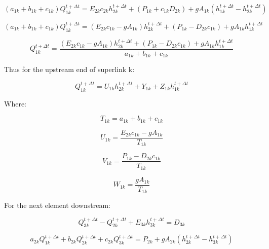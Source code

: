 \documentclass[11pt]{article}
\begin{document}
\begin{equation}
  (a_{1k} + b_{1k} + c_{1k}) Q_{1k}^{t + \Delta t} = E_{2k} c_{2k} h_{2k}^{t + \Delta t} + (P_{1k} + c_{1k} D_{2k}) + g A_{1k} (h_{1k}^{t + \Delta t} - h_{2k}^{t + \Delta t})
\end{equation}

\begin{equation}
  (a_{1k} + b_{1k} + c_{1k}) Q_{1k}^{t + \Delta t} = ( E_{2k} c_{1k} - g A_{1k} ) h_{2k}^{t + \Delta t} + (P_{1k} -  D_{2k} c_{1k}) + g A_{1k} h_{1k}^{t + \Delta t}
\end{equation}


\begin{equation}
   Q_{1k}^{t + \Delta t} = \frac{( E_{2k} c_{1k} - g A_{1k} ) h_{2k}^{t + \Delta t} + (P_{1k} -  D_{2k} c_{1k}) + g A_{1k} h_{1k}^{t + \Delta t}}{a_{1k} + b_{1k} + c_{1k}}
\end{equation}

Thus for the upstream end of superlink k:

\begin{equation}
  \boxed{
  Q_{1k}^{t + \Delta t} = U_{1k} h_{2k}^{t + \Delta t} + Y_{1k} + Z_{1k} h_{1k}^{t + \Delta t}
  }
\end{equation}

Where:

\begin{equation}
  \boxed{
  T_{1k} = a_{1k} + b_{1k} + c_{1k}
  }
\end{equation}

\begin{equation}
  \boxed{
  U_{1k} = \frac{E_{2k} c_{1k} - g A_{1k}}{T_{1k}}
  }
\end{equation}

\begin{equation}
  \boxed{
  V_{1k} = \frac{P_{1k} -  D_{2k} c_{1k}}{T_{1k}}
  } 
\end{equation}

\begin{equation}
  \boxed{
  W_{1k} = \frac{g A_{1k}}{T_{1k}}
  } 
\end{equation}

For the next element downstream:

\begin{equation}
  Q_{3k}^{t + \Delta t} - Q_{2k}^{t + \Delta t} + E_{3k} h_{3k}^{t + \Delta t} = D_{3k}
\end{equation}


\begin{equation}
   a_{2k} Q_{1k}^{t + \Delta t} + b_{2k} Q_{2k}^{t + \Delta t} + c_{2k} Q_{3k}^{t + \Delta t} = P_{2k} + g A_{2k} (h_{2k}^{t + \Delta t} - h_{3k}^{t + \Delta t})
\end{equation}
\end{document}
